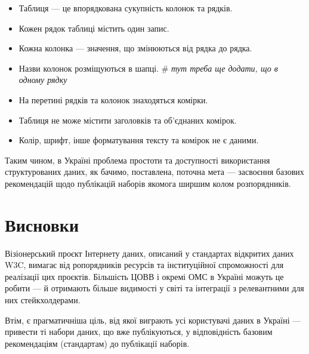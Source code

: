 \documentclass[
]{agujournal2019}
\providecommand{\tightlist}{%
  \setlength{\itemsep}{0pt}\setlength{\parskip}{0pt}}\usepackage{longtable,booktabs,array}
\begin{document}
\begin{itemize}
\tightlist
\item
  Таблиця --- це впорядкована сукупність колонок та рядків.
\item
  Кожен рядок таблиці містить один запис.
\item
  Кожна колонка --- значення, що змінюються від рядка до рядка.
\item
  Назви колонок розміщуються в шапці. \# \emph{тут треба ще додати, що в
  одному рядку}
\item
  На перетині рядків та колонок знаходяться комірки.
\item
  Таблиця не може містити заголовків та об'єднаних комірок.
\item
  Колір, шрифт, інше форматування тексту та комірок не є даними.
\end{itemize}

Таким чином, в Україні проблема простоти та доступності використання
структурованих даних, як бачимо, поставлена, поточна мета --- засвоєння
базових рекомендацій щодо публікацій наборів якомога ширшим колом
розпорядників.

\section{Висновки}\label{ux432ux438ux441ux43dux43eux432ux43aux438}

Візіонерський проєкт Інтернету даних, описаний у стандартах відкритих
даних W3C, вимагає від ропорядників ресурсів та інституційної
спроможності для реалізації цих проєктів. Більшість ЦОВВ і окремі ОМС в
Україні можуть це робити --- й отримають більше видимості у світі та
інтеграції з релевантними для них стейкхолдерами.

Втім, є прагматичніша ціль, від якої виграють усі користувачі даних в
Україні --- привести ті набори даних, що вже публікуються, у
відповідність базовим рекомендаціям (стандартам) до публікації наборів.
\end{document}
